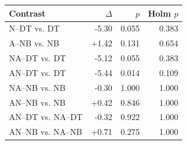 \begin{tabular}{lrrr}
\toprule
Contrast & $\Delta$ & $p$ & Holm $p$ \\
\midrule
N--DT vs. DT & -5.30 & 0.055 & 0.383 \\
A--NB vs. NB & +1.42 & 0.131 & 0.654 \\
NA--DT vs. DT & -5.12 & 0.055 & 0.383 \\
AN--DT vs. DT & -5.44 & 0.014 & 0.109 \\
NA--NB vs. NB & -0.30 & 1.000 & 1.000 \\
AN--NB vs. NB & +0.42 & 0.846 & 1.000 \\
AN--DT vs. NA--DT & -0.32 & 0.922 & 1.000 \\
AN--NB vs. NA--NB & +0.71 & 0.275 & 1.000 \\
\bottomrule
\end{tabular}
